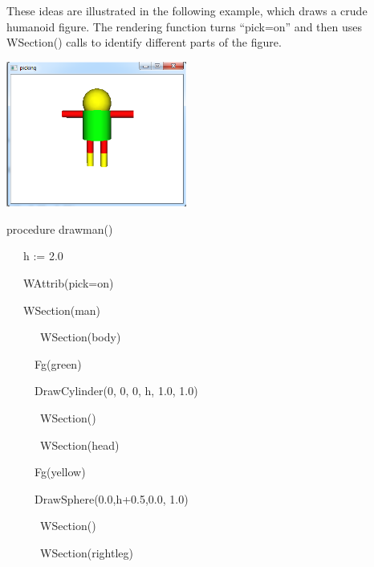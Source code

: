 \documentclass[letterpaper]{article}
\begin{document}
{\bigskip

These ideas are illustrated in the following example, which draws
a crude humanoid figure. The rendering function turns
\textsf{{}``pick=on''} and then uses \textsf{WSection()} calls to
identify different parts of the figure.


\begin{center}
\includegraphics[width=2.3402in,height=1.8799in]{utr9/utr9-img034.png}
\end{center}

\bigskip


\bigskip

{\sffamily
procedure drawman()}

{\sffamily
\ \ \ h := 2.0}

{\sffamily
\ \ \ WAttrib({\textquotedbl}pick=on{\textquotedbl})}

{\sffamily
\ \ \ WSection({\textquotedbl}man{\textquotedbl})}

{\sffamily
\ \ \ \ \ \ WSection({\textquotedbl}body{\textquotedbl})}

{\sffamily
\ \ \ \ \  Fg({\textquotedbl}green{\textquotedbl})}

{\sffamily
\ \ \ \ \  DrawCylinder(0, 0, 0, h, 1.0, 1.0)}

{\sffamily
\ \ \ \ \ \ WSection()}

{\sffamily
\ \ \ \ \ \ WSection({\textquotedbl}head{\textquotedbl})}

{\sffamily
\ \ \ \ \  Fg({\textquotedbl}yellow{\textquotedbl})}

{\sffamily
\ \ \ \ \  DrawSphere(0.0,h+0.5,0.0, 1.0)}

{\sffamily
\ \ \ \ \ \ WSection()}

{\sffamily
\ \ \ \ \ \ WSection({\textquotedbl}rightleg{\textquotedbl})}

}
\end{document}
